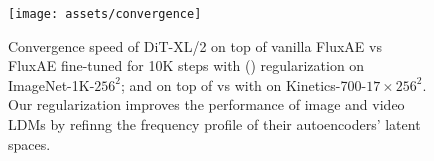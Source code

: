 \begin{figure}[ht]
\centering
\texttt{[image: assets/convergence]}
\vspace{-0.8cm}
\caption{Convergence speed of DiT-XL/2 on top of vanilla FluxAE vs FluxAE fine-tuned for 10K steps with \regname (\regshortname) regularization on ImageNet-1K-$256^2$; and on top of \cvaefull vs \cvaefull with \regshortname on Kinetics-700-$17\times256^2$. Our regularization improves the performance of image and video LDMs by refinng the frequency profile of their autoencoders' latent spaces.}
\label{fig:convergence}
\vspace{-0.3cm}
\end{figure}
